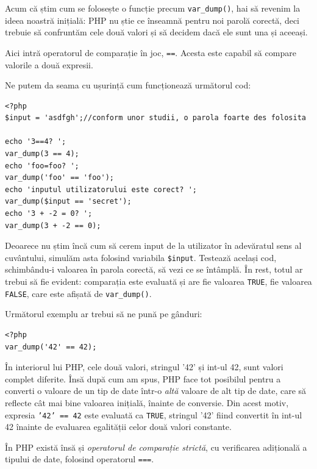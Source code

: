 Acum că știm cum se folosește o funcție precum \texttt{var\_dump()},
hai să revenim la ideea noastră inițială: PHP nu știe ce
înseamnă pentru noi {\glqq}parolă corectă{\grqq}, deci trebuie să confruntăm
cele două valori și să decidem dacă ele sunt una și aceeași.

Aici intră operatorul de comparație în joc, \texttt{==}. Acesta
este capabil să compare valorile a două expresii.


Ne putem da seama cu ușurință cum funcționează următorul cod:
\begin{lstlisting}
<?php
$input = 'asdfgh';//conform unor studii, o parola foarte des folosita

echo '3==4? ';
var_dump(3 == 4);
echo 'foo=foo? ';
var_dump('foo' == 'foo');
echo 'inputul utilizatorului este corect? ';
var_dump($input == 'secret');
echo '3 + -2 = 0? ';
var_dump(3 + -2 == 0);
\end{lstlisting}

Deoarece nu știm încă cum să cerem input de la utilizator
în adevăratul sens al cuvântului, simulăm asta folosind variabila \texttt{\$input}.
Testează același cod, schimbându-i valoarea în parola corectă,
să vezi ce se întâmplă. În rest, totul ar trebui să fie evident: comparația
este evaluată și are fie valoarea \texttt{TRUE}, fie valoarea \texttt{FALSE},
care este afișată de \texttt{var\_dump()}.

Următorul exemplu ar trebui să ne pună pe gânduri:
\begin{lstlisting}
<?php
var_dump('42' == 42);
\end{lstlisting}
În interiorul lui PHP, cele două valori, stringul '42'
și int-ul 42, sunt valori complet diferite. Însă
după cum am spus, PHP face tot posibilul pentru a
converti o valoare de un tip de date într-o \textit{altă}
valoare de alt tip de date, care să reflecte cât mai bine
valoarea inițială, înainte de conversie.
Din acest motiv, expresia \texttt{'42' == 42} este evaluată
ca \texttt{TRUE}, stringul '42' fiind convertit în int-ul 42 înainte
de evaluarea egalității celor două valori constante.

În PHP există însă și \textsl{operatorul de comparație strictă}, cu
verificarea adițională a tipului de date, folosind operatorul
\texttt{===}.

